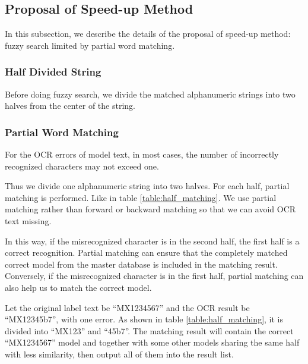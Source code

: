 \documentclass[technicalreport]{ieicej}
\begin{document}
    \subsection{Proposal of Speed-up Method}
        In this subsection, we describe the details of the proposal of speed-up method: fuzzy search limited by partial word matching.


        \subsubsection{Half Divided String}
            Before doing fuzzy search, we divide the matched alphanumeric strings into two halves from the center of the string.

        \subsubsection{Partial Word Matching}

            For the OCR errors of model text, in most cases, the number of incorrectly recognized characters may not exceed one.

            Thus we divide one alphanumeric string into two halves. For each half, partial matching is performed. Like in table \ref{table:half_matching}. We use partial matching rather than forward or backward matching so that we can avoid OCR text missing.

            In this way, if the misrecognized character is in the second half, the first half is a correct recognition. Partial matching can ensure that the completely matched correct model from the master database is included in the matching result. Conversely, if the misrecognized character is in the first half, partial matching can also help us to match the correct model.
            
            Let the original label text be “MX1234567” and the OCR result be “MX12345b7”, with one error. As shown in table \ref{table:half_matching}, it is divided into “MX123” and “45b7”. The matching result will contain the correct “MX1234567” model and together with some other models sharing the same half with less similarity, then output all of them into the result list.
\end{document}
